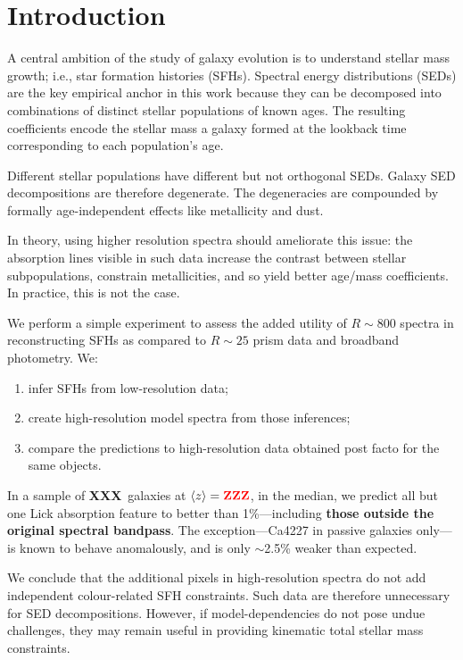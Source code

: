 \documentclass[a4paper,fleqn,usenatbib]{mnras}
\newcommand{\bfr}{\bf\color{red}}
\newcommand{\benum}{\begin{enumerate}}
\newcommand{\eenum}{\end{enumerate}}
\newcommand{\ntot}{{\bfr XXX}} %
\newcommand{\midz}{{\bfr ZZZ}} %
\begin{document}
\section{Introduction}
\label{sec:intro}

A central ambition of the study of galaxy evolution is to understand stellar mass growth; i.e., 
star formation histories (SFHs). Spectral energy distributions (SEDs) are the key empirical anchor 
in this work because they can be decomposed into combinations of distinct stellar populations of 
known ages. The resulting coefficients encode the stellar mass a galaxy formed at the lookback time 
corresponding to each population's age.
	
Different stellar populations have different but not orthogonal SEDs. Galaxy SED decompositions 
are therefore degenerate. The degeneracies are compounded by formally age-independent effects 
like metallicity and dust. 

In theory, using higher resolution spectra should ameliorate this issue: the absorption lines visible 
in such data increase the contrast between stellar subpopulations, constrain metallicities, and so yield 
better age/mass coefficients. In practice, this is not the case.

We perform a simple experiment to assess the added utility of $R\sim800$ spectra in 
reconstructing SFHs as compared to $R\sim25$ prism data and broadband photometry. We:
\benum
	\item infer SFHs from low-resolution data;
	\item create high-resolution model spectra from those inferences;
	\item compare the predictions to high-resolution data obtained post facto for the same
		objects. 
\eenum

In a sample of \ntot\ galaxies at $\langle z\rangle=\midz$, in the median, 
we predict all but one Lick absorption feature \citep{Worthey94} to better than 1\%---including 
{\bfr those outside the original spectral bandpass}. The exception---Ca4227 in passive 
galaxies only---is known to behave anomalously, and is only $\sim$2.5\% weaker than expected. 

We conclude that the additional pixels in high-resolution spectra do not add independent 
colour-related SFH constraints. Such data are therefore unnecessary for SED decompositions.
However, if model-dependencies do not pose undue challenges, they may remain useful
in providing kinematic total stellar mass constraints.
\end{document}
